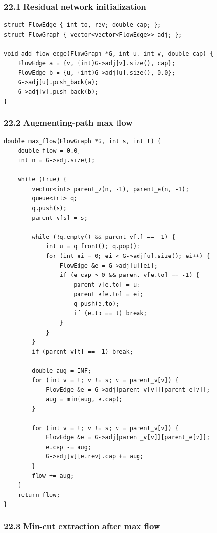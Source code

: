 \documentclass[11pt]{article}
\begin{document}
\subsubsection{22.1 Residual network initialization}\label{residual-network-initialization}

\begin{verbatim}
struct FlowEdge { int to, rev; double cap; };
struct FlowGraph { vector<vector<FlowEdge>> adj; };

void add_flow_edge(FlowGraph *G, int u, int v, double cap) {
    FlowEdge a = {v, (int)G->adj[v].size(), cap};
    FlowEdge b = {u, (int)G->adj[u].size(), 0.0};
    G->adj[u].push_back(a);
    G->adj[v].push_back(b);
}
\end{verbatim}

\subsubsection{22.2 Augmenting-path max flow}\label{augmenting-path-max-flow}

\begin{verbatim}
double max_flow(FlowGraph *G, int s, int t) {
    double flow = 0.0;
    int n = G->adj.size();

    while (true) {
        vector<int> parent_v(n, -1), parent_e(n, -1);
        queue<int> q;
        q.push(s);
        parent_v[s] = s;

        while (!q.empty() && parent_v[t] == -1) {
            int u = q.front(); q.pop();
            for (int ei = 0; ei < G->adj[u].size(); ei++) {
                FlowEdge &e = G->adj[u][ei];
                if (e.cap > 0 && parent_v[e.to] == -1) {
                    parent_v[e.to] = u;
                    parent_e[e.to] = ei;
                    q.push(e.to);
                    if (e.to == t) break;
                }
            }
        }
        if (parent_v[t] == -1) break;

        double aug = INF;
        for (int v = t; v != s; v = parent_v[v]) {
            FlowEdge &e = G->adj[parent_v[v]][parent_e[v]];
            aug = min(aug, e.cap);
        }

        for (int v = t; v != s; v = parent_v[v]) {
            FlowEdge &e = G->adj[parent_v[v]][parent_e[v]];
            e.cap -= aug;
            G->adj[v][e.rev].cap += aug;
        }
        flow += aug;
    }
    return flow;
}
\end{verbatim}

\subsubsection{22.3 Min-cut extraction after max flow}\label{min-cut-extraction-after-max-flow}
\end{document}
